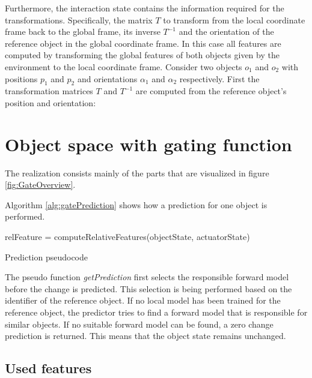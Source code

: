 Furthermore, the interaction state contains the information required for the transformations. Specifically, the matrix $T$ to transform from the local coordinate frame back to the global 
frame, its inverse $T^{-1}$ and the orientation of the reference object in the global coordinate frame.
In this case all features are computed by transforming the global features of both objects given by the environment to the local coordinate frame. Consider two objects $o_1$ and $o_2$ with positions $p_1$ and $p_2$ and orientations $\alpha_1$ and $\alpha_2$ respectively. First the transformation matrices $T$ and $T^{-1}$ are computed from the reference object's position and orientation:


\section{Object space with gating function \label{sec:gateRealization}}

The realization consists mainly of the parts that are visualized in figure \ref{fig:GateOverview}. 

Algorithm \ref{alg:gatePrediction} shows how a prediction for one object is performed. 


\begin{algorithm}
	\BlankLine
	relFeature = computeRelativeFeatures(objectState, actuatorState)\\
	\caption{Prediction pseudocode}
	\label{alg:gatePrediction}
\end{algorithm}

The pseudo function \textit{getPrediction} first selects the responsible forward model before the change is predicted. This selection is being performed based on the identifier of the reference object. If no local model has been trained for the reference object, the predictor tries to find a forward model that is responsible for similar objects. If no suitable forward model can be found, a zero change prediction is returned. This means that the object state remains unchanged.


\subsection{Used features}

